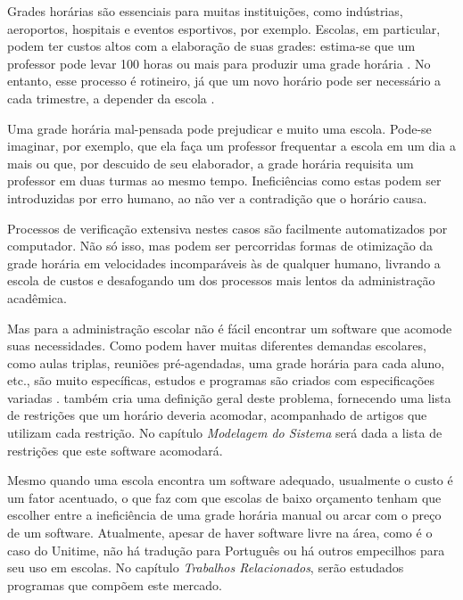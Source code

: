 \documentclass{subfiles}
\begin{document}

	\par Grades horárias são essenciais para muitas instituições, como indústrias, aeroportos, hospitais e eventos esportivos, por exemplo. Escolas, em particular, podem ter custos altos com a elaboração de suas grades: estima-se que um professor pode levar 100 horas ou mais para produzir uma grade horária \cite{appleby}. No entanto, esse processo é rotineiro, já que um novo horário pode ser necessário a cada trimestre, a depender da escola \cite{minhapesquisa}.

	\par Uma grade horária mal-pensada pode prejudicar e muito uma escola. Pode-se imaginar, por exemplo, que ela faça um professor frequentar a escola em um dia a mais ou que, por descuido de seu elaborador, a grade horária requisita um professor em duas turmas ao mesmo tempo. Ineficiências como estas podem ser introduzidas por erro humano, ao não ver a contradição que o horário causa.

	\par Processos de verificação extensiva nestes casos são facilmente automatizados por computador. Não só isso, mas podem ser percorridas formas de otimização da grade horária em velocidades incomparáveis às de qualquer humano, livrando a escola de custos e desafogando um dos processos mais lentos da administração acadêmica.

	\par Mas para a administração escolar não é fácil encontrar um software que acomode suas necessidades. Como podem haver muitas diferentes demandas escolares, como aulas triplas, reuniões pré-agendadas, uma grade horária para cada aluno, etc., são muito específicas, estudos e programas são criados com especificações variadas \cite{Pillay}. \cite{Pillay} também cria uma definição geral deste problema, fornecendo uma lista de restrições que um horário deveria acomodar, acompanhado de artigos que utilizam cada restrição. No capítulo \textit{Modelagem do Sistema} será dada a lista de restrições que este software acomodará.

	\par Mesmo quando uma escola encontra um software adequado, usualmente o custo é um fator acentuado, o que faz com que escolas de baixo orçamento tenham que escolher entre a ineficiência de uma grade horária manual ou arcar com o preço de um software. Atualmente, apesar de haver software livre na área, como é o caso do Unitime, não há tradução para Português ou há outros empecilhos para seu uso em escolas. No capítulo \textit{Trabalhos Relacionados}, serão estudados programas que compõem este mercado.
\end{document}
